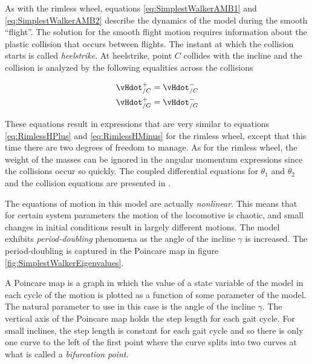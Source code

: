 As with the rimless wheel, equations \ref{eq:SimplestWalkerAMB1} and \ref{eq:SimplestWalkerAMB2} describe the dynamics of the model during the smooth ``flight''. The solution for the smooth flight motion requires information about the plastic collision that occurs between flights. The instant at which the collision starts is called \textit{heelstrike}. At heelstrike, point $C$ collides with the incline and the collision is analyzed by the following equalities across the collisions

\begin{align}
\vHdot_{/C}^{+} &= \vHdot_{/C}^{-} \notag \\
\vHdot_{/G}^{+} &= \vHdot_{/G}^{-} \notag
\label{eq:SimplestWalkerCollision}
\end{align}

These equations result in expressions that are very similar to equations \ref{eq:RimlessHPlus} and \ref{eq:RimlessHMinus} for the rimless wheel, except that this time there are two degrees of freedom to manage. As for the rimless wheel, the weight of the masses can be ignored in the angular momentum expressions since the collisions occur so quickly. The coupled differential equations for $\theta_{1}$ and $\theta_{2}$ and the collision equations are presented in \cite{garcia97}. 

The equations of motion in this model are actually \emph{nonlinear}. This means that for certain system parameters the motion of the locomotive is chaotic, and small changes in initial conditions result in largely different motions. The model exhibits \emph{period-doubling} phenomena as the angle of the incline $\gamma$ is increased. The period-doubling is captured in the Poincare map in figure \ref{fig:SimplestWalkerEigenvalues}.

A Poincare map is a graph in which the value of a state variable of the model in each cycle of the motion is plotted as a function of some parameter of the model. The natural parameter to use in this case is the angle of the incline $\gamma$. The vertical axis of the Poincare map holds the step length for each gait cycle. For small inclines, the step length is constant for each gait cycle and so there is only one curve to the left of the first point where the curve splits into two curves at what is called a \emph{bifurcation point}.

